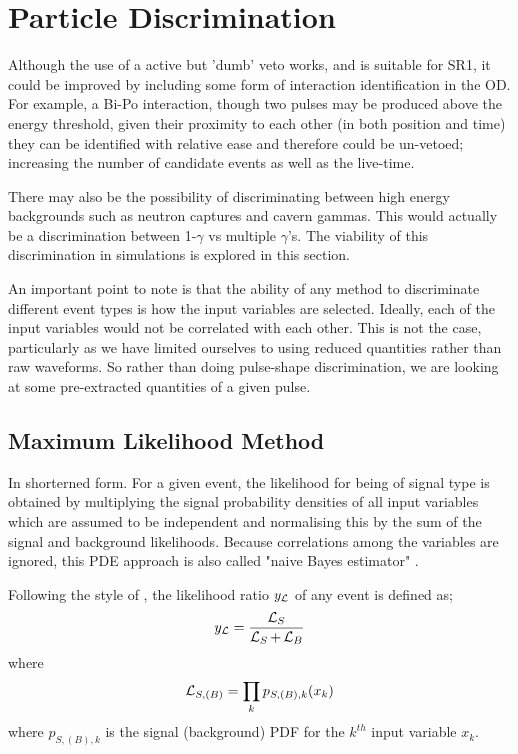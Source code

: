 \section{Particle Discrimination}
\par
Although the use of a active but 'dumb' veto works, and is suitable for SR1, it could be improved by including some form of interaction identification in the OD.
For example, a Bi-Po interaction, though two pulses may be produced above the energy threshold, given their proximity to each other (in both position and time) they can be identified with relative ease and therefore could be un-vetoed; increasing the number of candidate events as well as the live-time.

\par
There may also be the possibility of discriminating between high energy backgrounds such as neutron captures and cavern gammas.
This would actually be a discrimination between 1-$\gamma$ vs multiple $\gamma$'s.
The viability of this discrimination in simulations is explored in this section.


\par
An important point to note is that the ability of any method to discriminate different event types is how the input variables are selected.
Ideally, each of the input variables would not be correlated with each other.
This is not the case, particularly as we have limited ourselves to using reduced quantities rather than raw waveforms.
So rather than doing pulse-shape discrimination, we are looking at some pre-extracted quantities of a given pulse.

\subsection{Maximum Likelihood Method}
\par
In shorterned form. 
For a given event, the likelihood for being of signal type is obtained by multiplying the signal probability densities of all input variables which are assumed to be independent and normalising this by the sum of the signal and background likelihoods.
Because correlations among the variables are ignored, this PDE approach is also called "naive Bayes estimator" \cite{TMVA_ref}.

Following the style of \cite{TMVA_ref}, the likelihood ratio $y_{\operatorname{\mathcal{L}}}$ of any event is defined as;
\begin{equation}
    y_{\operatorname{\mathcal{L}}} = \frac{\operatorname{\mathcal{L}}_{S}}{\operatorname{\mathcal{L}}_{S} + \operatorname{\mathcal{L}}_{B}}
\end{equation}
where
\begin{equation}
    \operatorname{\mathcal{L}}_{S,(B)} = \prod_k p_{S,(B),k}(x_k)
\end{equation}
where $p_{S,(B),k}$ is the signal (background) PDF for the $k^{th}$ input variable $x_k$.

